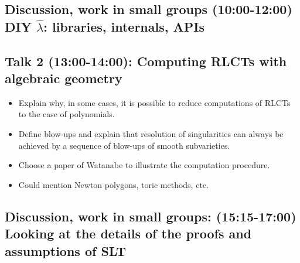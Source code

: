 \documentclass[a4paper,11pt]{amsart}
\newcommand{\lambdahat}{\widehat{\lambda}}
\begin{document}
\subsection*{Discussion, work in small groups (10:00-12:00) DIY $\lambdahat$: libraries, internals, APIs}

\subsection*{Talk 2 (13:00-14:00): Computing RLCTs with algebraic geometry}

\begin{itemize}
\item Explain why, in some cases, it is possible to reduce computations of RLCTs to the case of polynomials.
\item Define blow-ups and explain that resolution of singularities can always be achieved by a sequence of blow-ups of smooth subvarieties.  
\item Choose a paper of Watanabe to illustrate the computation procedure.
\item Could mention Newton polygons, toric methods, etc.
\end{itemize}

\subsection*{Discussion, work in small groups: (15:15-17:00) Looking at the details of the proofs and assumptions of SLT}
\end{document}
